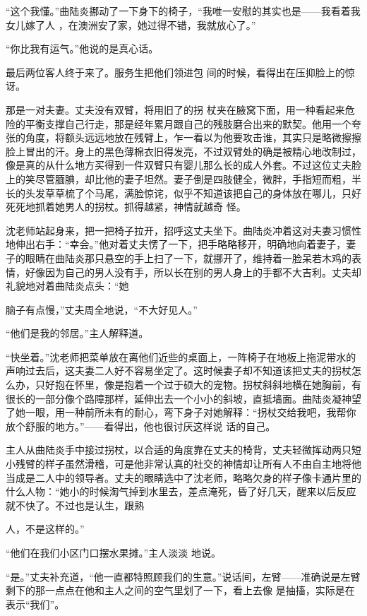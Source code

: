 \documentclass{article}
\begin{document}
“这个我懂。”曲陆炎挪动了一下身下的椅子，“我唯一安慰的其实也是——我看着我女儿嫁了人
，在澳洲安了家，她过得不错，我就放心了。” 


“你比我有运气。”他说的是真心话。 

最后两位客人终于来了。服务生把他们领进包
间的时候，看得出在压抑脸上的惊讶。 

那是一对夫妻。丈夫没有双臂，将用旧了的拐
\newpage
杖夹在腋窝下面，用一种看起来危险的平衡支撑自己行走，那是经年累月跟自己的残肢磨合出来的默契。他用一个夸张的角度，将额头远远地放在残臂上，乍一看以为他要攻击谁，其实只是略微擦擦脸上冒出的汗。身上的黑色薄棉衣旧得发亮，不过双臂处的确是被精心地改制过，像是真的从什么地方买得到一件双臂只有婴儿那么长的成人外套。不过这位丈夫脸上的笑尽管腼腆，却比他的妻子坦然。妻子倒是四肢健全，微胖，手指短而粗，半长的头发草草梳了个马尾，满脸惊诧，似乎不知道该把自己的身体放在哪儿，只好死死地抓着她男人的拐杖。抓得越紧，神情就越奇
怪。 

沈老师站起身来，把一把椅子拉开，招呼这丈夫坐下。曲陆炎冲着这对夫妻习惯性地伸出右手：“幸会。”他对着丈夫愣了一下，把手略略移开，明确地向着妻子，妻子的眼睛在曲陆炎那只悬空的手上扫了一下，就挪开了，维持着一脸呆若木鸡的表情，好像因为自己的男人没有手，所以长在别的男人身上的手都不大吉利。丈夫却礼貌地对着曲陆炎点头：“她

\newpage
脑子有点慢，”丈夫周全地说，“不大好见人。” 


“他们是我的邻居。”主人解释道。 

“快坐着。”沈老师把菜单放在离他们近些的桌面上，一阵椅子在地板上拖泥带水的声响过去后，这夫妻二人好不容易坐定了。这时候妻子却不知道该把丈夫的拐杖怎么办，只好抱在怀里，像是抱着一个过于硕大的宠物。拐杖斜斜地横在她胸前，有很长的一部分像个路障那样，延伸出去一个小小的斜坡，直抵墙面。曲陆炎凝神望了她一眼，用一种前所未有的耐心，弯下身子对她解释：“拐杖交给我吧，我帮你放个舒服的地方。”——看得出，他也很讨厌这样说
话的自己。 

主人从曲陆炎手中接过拐杖，以合适的角度靠在丈夫的椅背，丈夫轻微挥动两只短小残臂的样子虽然滑稽，可是他非常认真的社交的神情却让所有人不由自主地将他当成是二人中的领导者。丈夫的眼睛选中了沈老师，略略欠身的样子像卡通片里的什么人物：“她小的时候淘气掉到水里去，差点淹死，昏了好几天，醒来以后反应就不快了。不过也是认生，跟熟
\newpage

人，不是这样的。” 

“他们在我们小区门口摆水果摊。”主人淡淡
地说。 

“是。”丈夫补充道，“他一直都特照顾我们的生意。”说话间，左臂——准确说是左臂剩下的那一点点在他和主人之间的空气里划了一下，看上去像
是抽搐，实际是在表示“我们”。 
\end{document}

